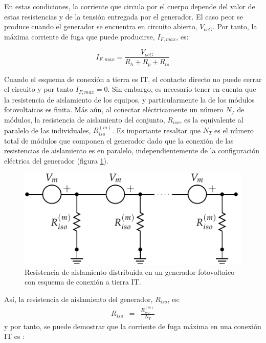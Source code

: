 En estas condiciones, la corriente que circula por el cuerpo depende
del valor de estas resistencias y de la tensión entregada por el generador.
El caso peor se produce cuando el generador se encuentra en circuito
abierto, $V_{ocG}$. Por tanto, la máxima corriente de fuga que puede
producirse, $I_{F,max}$,
es:

\begin{equation}
I_{F,max}=\frac{V_{ocG}}{R_{h}+R_{p}+R_{ts}}\label{eq:IfmaxTT}\end{equation}


Cuando el esquema de conexión a tierra es IT, el contacto directo
no puede cerrar el circuito y por tanto $I_{F,max}=0$. Sin embargo,
es necesario tener en cuenta que la resistencia de aislamiento de
los equipos, y particularmente la de los módulos fotovoltaicos es
finita. Más aún, al conectar eléctricamente un número $N_{T}$
de módulos, la resistencia de aislamiento del conjunto, $R_{iso}$,
es la equivalente al paralelo de las individuales, $R_{iso}^{(m)}$.
Es importante resaltar que $N_{T}$ es el número total de módulos
que componen el generador dado que la conexión de las resistencias
de aislamiento es en paralelo, independientemente de la configuración
eléctrica del generador (figura \ref{fig:RisoDistribuidaIT}). 

%
\begin{figure}
\includegraphics{../figs/ContactoDirectoIT}

\caption{\label{fig:RisoDistribuidaIT}Resistencia de aislamiento distribuida
en un generador fotovoltaico con esquema de conexión a tierra IT.}

\end{figure}


Así, la resistencia de aislamiento del generador, $R_{iso}$, es:\begin{eqnarray}
R_{iso} & = & \frac{R_{iso}^{(m)}}{N_{T}}\label{eq:RisoIT}\end{eqnarray}
y por tanto, se puede demostrar que la corriente de fuga máxima en
una conexión IT es \citep{Gomez-Vidal2000}: 

